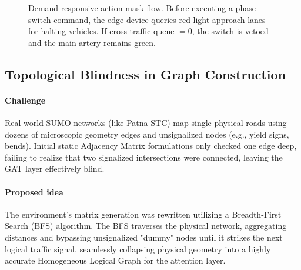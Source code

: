 \documentclass[12pt, onecolumn]{IEEEtran}
\begin{document}
\begin{figure}[H]
{\begin{tikzpicture}
\end{tikzpicture}
}
    \caption{Demand-responsive action mask flow. Before executing a phase switch command, the edge device queries red-light approach lanes for halting vehicles. If cross-traffic queue $= 0$, the switch is vetoed and the main artery remains green.}
    \label{fig:demand_switch}
    \end{figure}

\subsection{Topological Blindness in Graph Construction}
\paragraph{Challenge} Real-world SUMO networks (like Patna STC) map single physical roads using dozens of microscopic geometry edges and unsignalized nodes (e.g., yield signs, bends). Initial static Adjacency Matrix formulations only checked one edge deep, failing to realize that two signalized intersections were connected, leaving the GAT layer effectively blind. \\
\paragraph{Proposed idea} The environment's matrix generation was rewritten utilizing a Breadth-First Search (BFS) algorithm. The BFS traverses the physical network, aggregating distances and bypassing unsignalized "dummy" nodes until it strikes the next logical traffic signal, seamlessly collapsing physical geometry into a highly accurate Homogeneous Logical Graph for the attention layer.
\end{document}
